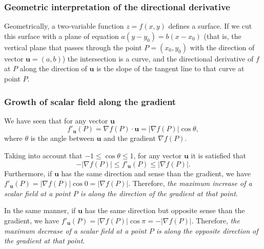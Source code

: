 \begin{frame}
\frametitle{Geometric interpretation of the directional derivative}
Geometrically, a two-variable function $z=f(x,y)$ defines a surface.
If we cut this surface with a plane of equation $a(y-y_0)=b(x-x_0)$ (that is, the vertical plane that passes through the point $P=(x_0,y_0)$ with the direction of vector $\mathbf{u}=(a,b)$)
the intersection is a curve, and the directional derivative of $f$ at $P$ along the direction of $\mathbf{u}$ is the slope of the tangent line to that curve at point $P$.

\begin{center}

\end{center}
\end{frame}



\begin{frame}
\frametitle{Growth of scalar field along the gradient}
We have seen that for any vector $\mathbf{u}$
\[
f'_{\mathbf{u}}(P) = \nabla f(P)\cdot \mathbf{u} = |\nabla f(P)|\cos \theta,
\]
where $\theta$ is the angle between $\mathbf{u}$ and the gradient $\nabla f(P)$.

Taking into account that $-1\leq \cos\theta\leq 1$, for any vector $\mathbf{u}$ it is satisfied that
\[
-|\nabla f(P)|\leq f'_{\mathbf{u}}(P)\leq |\nabla f(P)|.
\]
Furthermore, if $\mathbf{u}$ has the same direction and sense than the gradient, we have $f'_{\mathbf{u}}(P)=|\nabla f(P)|\cos 0=|\nabla f(P)|$.
Therefore, \alert{\emph{the maximum increase of a scalar field at a point $P$ is along the direction of the gradient at that point}}.

In the same manner, if $\mathbf{u}$ has the same direction but opposite sense than the gradient, we have $f'_{\mathbf{u}}(P)=|\nabla f(P)|\cos \pi=-|\nabla f(P)|$.
Therefore, \alert{\emph{the maximum decrease of a scalar field at a point $P$ is along the opposite direction of the gradient at that point}}.
\end{frame}



